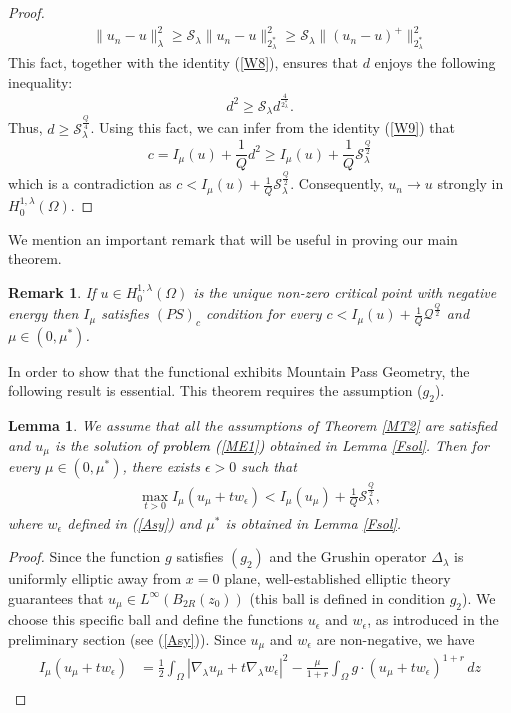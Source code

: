 \documentclass[12pt, notitlepage]{article}
\newtheorem{lem}[theorem]{Lemma}
\newtheorem{rmk}[theorem]{Remark}
\begin{document}
{\begin{proof}
\begin{align}
    \|u_n-u\|_\lambda^2\geq \mathcal{S}_\lambda\|u_n-u\|^2_{2^*_\lambda}\geq \mathcal{S}_\lambda\|(u_n-u)^+\|^2_{2^*_\lambda}
\end{align}
This fact, together with the identity (\ref{W8}), ensures that $d$ enjoys the following inequality:
$$d^2\geq \mathcal{S}_\lambda d^\frac{4}{2^*_\lambda}.$$
Thus, $d\geq \mathcal{S}_\lambda^\frac{Q}{4}$. Using this fact, we can infer from the identity (\ref{W9}) that $$c=I_\mu(u)+\frac{1}{Q}d^2\geq I_\mu(u)+\frac{1}{Q}\mathcal{S}_\lambda^\frac{Q}{2}$$
which is a contradiction as $c<I_\mu(u)+\frac{1}{Q}\mathcal{S}_\lambda^\frac{Q}{2}$. Consequently, $u_n\to u$ strongly in $H^{1,\lambda}_0(\Omega)$.
\end{proof}
We mention an important remark that will be useful in proving our main theorem.
\begin{rmk}
    If $u\in H^{1,\lambda}_0(\Omega)$ is the unique non-zero critical point with negative energy then $I_\mu$ satisfies $(PS)_c$ condition for every $c<I_\mu(u)+\frac{1}{Q}\mathcal{Q}^\frac{Q}{2}$ and $\mu\in(0,\mu^*)$.
\end{rmk}
In order to show that the functional exhibits Mountain Pass Geometry, the following result is essential. This theorem requires the assumption ($g_2$).
\begin{lem}\label{MPL}
    We assume that all the assumptions of Theorem \ref{MT2} are satisfied and $u_\mu$ is the solution of \textcolor{black}{problem (\ref{ME1})} obtained in Lemma \ref{Fsol}. Then for every $\mu\in(0,\mu^*)$, there exists $\epsilon>0$ such that 
    \begin{align}
        \max_{t>0}I_\mu(u_\mu+tw_\epsilon) < I_\mu(u_\mu)+\frac{1}{Q}\mathcal{S}_\lambda^\frac{Q}{2},
    \end{align}
    where $w_\epsilon$ defined in (\ref{Asy}) and $\mu^*$ is obtained in Lemma \ref{Fsol}.
\end{lem}
\begin{proof}
Since the function $g$ satisfies $(g_2)$ and the Grushin operator $\Delta_\lambda$ is uniformly elliptic away from $x=0$ plane, well-established elliptic theory guarantees that $u_\mu\in L^\infty(B_{2R}(z_0))$ (this ball is defined in condition $g_2$). We choose this specific ball and define the functions $u_\epsilon$ and $w_\epsilon$, as introduced in the preliminary section (see (\ref{Asy})). Since $u_\mu$ and $w_\epsilon$ are non-negative, we have
\begin{align}
    I_\mu(u_\mu+tw_\epsilon)&=\frac{1}{2}\int_\Omega |\nabla_\lambda u_\mu+t \nabla_\lambda w_\epsilon|^2-\frac{\mu}{1+r}\int_\Omega g\cdot (u_\mu+tw_\epsilon)^{1+r}\, dz\nonumber\\

\end{align}
\end{proof}}
\end{document}
